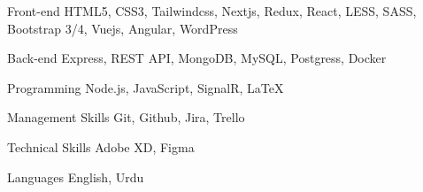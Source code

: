 

\begin{cvskills}

  \cvskill
    {Front-end} %
    {HTML5, CSS3, Tailwindcss, Nextjs, Redux, React, LESS, SASS, Bootstrap 3/4, Vuejs, Angular, WordPress} %

  \cvskill
    {Back-end} %
    {Express, REST API, MongoDB, MySQL, Postgress, Docker } %

  \cvskill
    {Programming} %
    {Node.js, JavaScript, SignalR, LaTeX} %

  \cvskill
    {Management Skills} %
    {Git, Github, Jira, Trello} %

  \cvskill
    {Technical Skills} %
    {Adobe XD, Figma} %

  \cvskill
    {Languages} %
    {English, Urdu} %

\end{cvskills}
